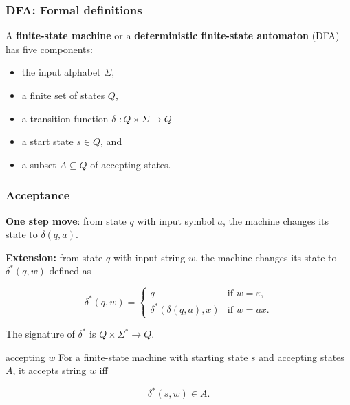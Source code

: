 

\newcommand\sbullet[1][.5]{\mathbin{\vcenter{\hbox{\scalebox{#1}{$\bullet$}}}}}

\renewcommand{\epsilon}{\varepsilon}

\newcommand{\czero}{{\mathtt 0}}
\newcommand{\cone}{{\mathtt 1}}

\begin{frame}
  \frametitle{DFA: Formal definitions}

  A {\color{red}\bf finite-state machine} or a {\color{red}\bf
    deterministic finite-state automaton} (DFA) has five components:

  \begin{itemize}
  \item the input alphabet $\Sigma$,
  \item a finite set of states $Q$,
  \item a transition function $\delta$ $:Q\times\Sigma \longrightarrow Q$
  \item a start state $s\in Q$, and
  \item a subset $A\subseteq Q$ of accepting states.
  \end{itemize}
  
\end{frame}

\begin{frame}
  \frametitle{Acceptance}

  {\bf One step move}: from state $q$ with input symbol $a$, the
  machine changes its state to $\delta(q,a)$.

  {\bf Extension:} from state $q$ with input string $w$, the machine
  changes its state to $\delta^*(q,w)$ defined as

  \begin{block}{}
  \[
  \delta^*(q,w) = \left\{
  \begin{array}{ll}
    q & \mbox{if $w=\epsilon$,} \\
    \delta^*(\delta(q,a),x) & \mbox{if $w=ax$.}
  \end{array}
  \right.
  \]
  \end{block}
  
  The signature of $\delta^*$ is $Q\times\Sigma^* \longrightarrow Q$.

  \begin{block}{accepting $w$}   
    For a finite-state machine with starting state $s$ and accepting
    states $A$, it accepts string $w$ iff
    
    \[
    \delta^*(s,w)\in A.
    \]
  \end{block}
\end{frame}

